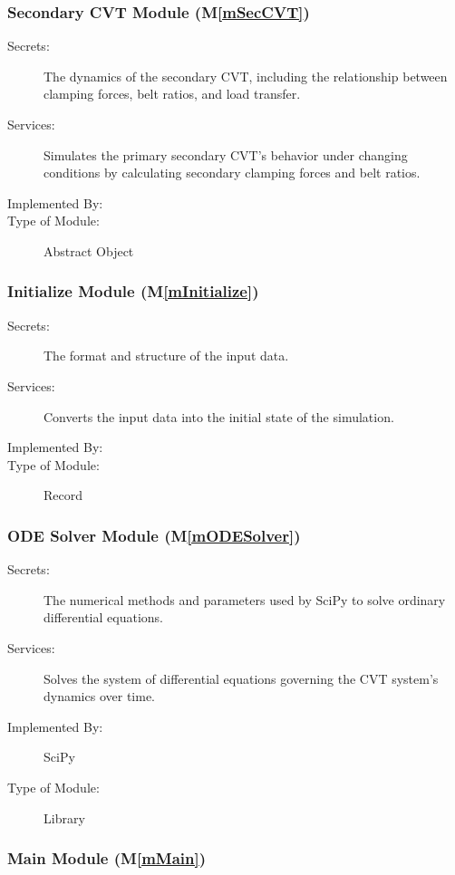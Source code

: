 \documentclass[12pt, titlepage]{article}
\newcommand{\mref}[1]{M\ref{#1}}
\begin{document}
\subsubsection{Secondary CVT Module (\mref{mSecCVT})}

\begin{description}
\item[Secrets:] The dynamics of the secondary CVT, including the relationship between clamping forces, belt ratios, and load transfer.
\item[Services:] Simulates the primary secondary CVT's behavior under changing conditions by calculating secondary clamping forces and belt ratios.
\item[Implemented By:] \progname{}
\item[Type of Module:] Abstract Object
\end{description}

\subsubsection{Initialize Module (\mref{mInitialize})}

\begin{description}
\item[Secrets:]The format and structure of the input data.
\item[Services:]Converts the input data into the initial state of the simulation.
\item[Implemented By:] \progname{}
\item[Type of Module:] Record
\end{description}


\subsubsection{ODE Solver Module (\mref{mODESolver})}

\begin{description}
\item[Secrets:] The numerical methods and parameters used by SciPy to solve ordinary differential equations.
\item[Services:] Solves the system of differential equations governing the CVT system's dynamics over time.
\item[Implemented By:] SciPy
\item[Type of Module:] Library
\end{description}

\subsubsection{Main Module (\mref{mMain})}
\end{document}
